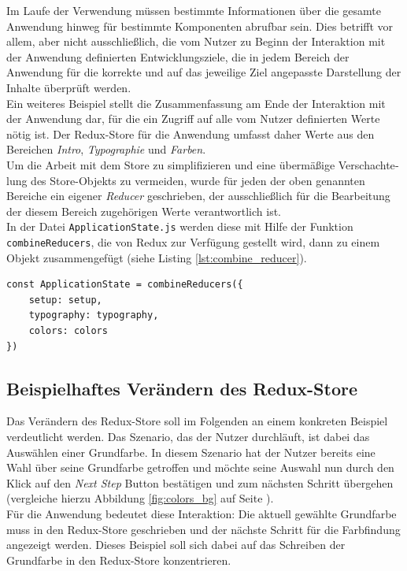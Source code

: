 Im Laufe der Verwendung müssen bestimmte Informationen über die gesamte Anwendung hinweg für bestimmte Komponenten abrufbar sein. Dies betrifft vor allem, aber nicht ausschließlich, die vom Nutzer zu Beginn der Interaktion mit der Anwendung definierten Entwicklungsziele, die in jedem Bereich der Anwendung für die korrekte und auf das jeweilige Ziel angepasste Darstellung der  Inhalte überprüft werden.\\
Ein weiteres Beispiel stellt die Zusammenfassung am Ende der Interaktion mit der Anwendung dar, für die ein Zugriff auf alle vom Nutzer definierten Werte nötig ist. Der Redux-Store für die Anwendung umfasst daher Werte aus den Bereichen \textit{Intro}, \textit{Typographie} und \textit{Farben}.\\

Um die Arbeit mit dem Store zu simplifizieren und eine übermäßige Ver­schach­te­lung des Store-Objekts zu vermeiden, wurde für jeden der oben genannten Bereiche ein eigener \textit{Reducer} geschrieben, der ausschließlich für die Bearbeitung der diesem Bereich zugehörigen Werte verantwortlich ist.\\
In der Datei \verb|ApplicationState.js| werden diese mit Hilfe der Funktion \verb|combineReducers|, die von Redux zur Verfügung gestellt wird, dann zu einem Objekt zusammengefügt (siehe Listing \ref{lst:combine_reducer}).

\begin{lstlisting}[caption={Zusammenfügen der dedizierten Reducer zu einem Objekt}, label=lst:combine_reducer]
  const ApplicationState = combineReducers({
    setup: setup,
    typography: typography,
    colors: colors
})
\end{lstlisting}

\subsection{Beispielhaftes Verändern des Redux-Store}
Das Verändern des Redux-Store soll im Folgenden an einem konkreten Beispiel verdeutlicht werden. Das Szenario, das der Nutzer durchläuft, ist dabei das Auswählen einer Grundfarbe. In diesem Szenario hat der Nutzer bereits eine Wahl über seine Grundfarbe getroffen und möchte seine Auswahl nun durch den Klick auf den \textit{Next Step} Button bestätigen und zum nächsten Schritt übergehen (vergleiche hierzu Abbildung \ref{fig:colors_bg} auf Seite \pageref{fig:colors_bg}).\\
Für die Anwendung bedeutet diese Interaktion: Die aktuell gewählte Grundfarbe muss in den Redux-Store geschrieben\footnotemark{} und der nächste Schritt für die Farbfindung angezeigt werden. Dieses Beispiel soll sich dabei auf das Schreiben der Grundfarbe in den Redux-Store konzentrieren.\\

